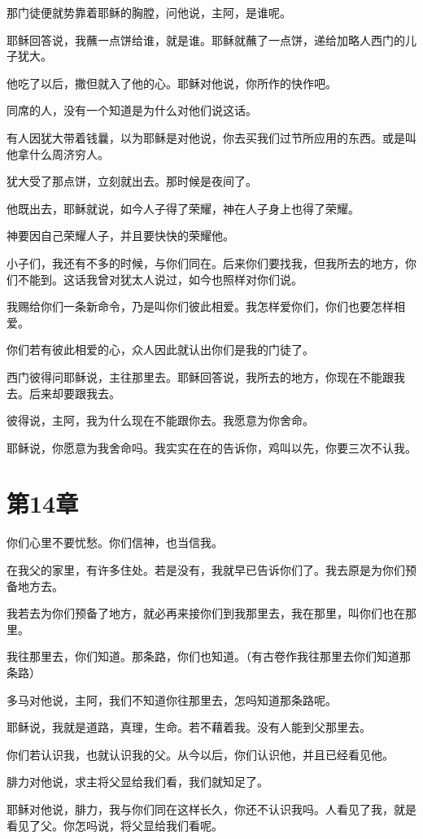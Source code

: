 \documentclass[12pt,oneside]{book}
\begin{document}
那门徒便就势靠着耶稣的胸膛，问他说，主阿，是谁呢。

耶稣回答说，我蘸一点饼给谁，就是谁。耶稣就蘸了一点饼，递给加略人西门的儿子犹大。

他吃了以后，撒但就入了他的心。耶稣对他说，你所作的快作吧。

同席的人，没有一个知道是为什么对他们说这话。

有人因犹大带着钱曩，以为耶稣是对他说，你去买我们过节所应用的东西。或是叫他拿什么周济穷人。

犹大受了那点饼，立刻就出去。那时候是夜间了。

他既出去，耶稣就说，如今人子得了荣耀，神在人子身上也得了荣耀。

神要因自己荣耀人子，并且要快快的荣耀他。

小子们，我还有不多的时候，与你们同在。后来你们要找我，但我所去的地方，你们不能到。这话我曾对犹太人说过，如今也照样对你们说。

我赐给你们一条新命令，乃是叫你们彼此相爱。我怎样爱你们，你们也要怎样相爱。

你们若有彼此相爱的心，众人因此就认出你们是我的门徒了。

西门彼得问耶稣说，主往那里去。耶稣回答说，我所去的地方，你现在不能跟我去。后来却要跟我去。

彼得说，主阿，我为什么现在不能跟你去。我愿意为你舍命。

耶稣说，你愿意为我舍命吗。我实实在在的告诉你，鸡叫以先，你要三次不认我。

\chapter{第14章}
你们心里不要忧愁。你们信神，也当信我。

在我父的家里，有许多住处。若是没有，我就早已告诉你们了。我去原是为你们预备地方去。

我若去为你们预备了地方，就必再来接你们到我那里去，我在那里，叫你们也在那里。

我往那里去，你们知道。那条路，你们也知道。（有古卷作我往那里去你们知道那条路）

多马对他说，主阿，我们不知道你往那里去，怎吗知道那条路呢。

耶稣说，我就是道路，真理，生命。若不藉着我。没有人能到父那里去。

你们若认识我，也就认识我的父。从今以后，你们认识他，并且已经看见他。

腓力对他说，求主将父显给我们看，我们就知足了。

耶稣对他说，腓力，我与你们同在这样长久，你还不认识我吗。人看见了我，就是看见了父。你怎吗说，将父显给我们看呢。
\end{document}
